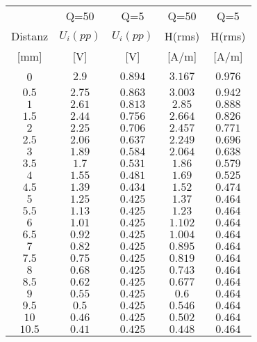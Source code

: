 \documentclass[12pt,a4paper,ngerman]{article}
\begin{document}
\centering
\begin{tabular}{ |c|c|c|c|c| }
  \hline
     & Q=50 & Q=5 & Q=50 & Q=5\\

    Distanz & $U_i(pp)$ & $U_i(pp)$ & H(rms) & H(rms)\\

  [mm] & [V] & [V] & [A/m] & [A/m] \\
  \hline
  0 & $2.9$ & $0.894$ & $3.167$ & $0.976$ \\
  \hline
  $0.5$ & $2.75$ & $0.863$ & $3.003$ & $0.942$ \\
  \hline
  $1$ & $2.61$ & $0.813$ & $2.85$ & $0.888$ \\
  \hline
  $1.5$ & $2.44$ & $0.756$ & $2.664$ & $0.826$ \\
    \hline
  $2$ & $2.25$ & $0.706$ & $2.457$ & $0.771$ \\
    \hline
  $2.5$ & $2.06$ & $0.637$ & $2.249$ & $0.696$ \\
    \hline
  $3$ & $1.89$ & $0.584$ & $2.064$ & $0.638$ \\
    \hline
  $3.5$ & $1.7$ & $0.531$ & $1.86$ & $0.579$\\
    \hline
  $4$ & $1.55$ & $0.481$ & $1.69$ & $0.525$ \\
    \hline
  $4.5$ & $1.39$ & $0.434$ & $1.52$ & $0.474$ \\
    \hline
  $5$ & $1.25$ & $0.425$ & $1.37$ & $0.464$ \\
    \hline
  $5.5$ & $1.13$ & $0.425$ & $1.23$ & $0.464$ \\
     \hline
  $6$ & $1.01$ & $0.425$ & $1.102$ & $0.464$ \\
      \hline
  $6.5$ & $0.92$ & $0.425$ & $1.004$ & $0.464$ \\ 
      \hline
  $7$ & $0.82$ & $0.425$ & $0.895$ & $0.464$ \\
      \hline
  $7.5$ & $0.75$ & $0.425$ & $0.819$ & $0.464$ \\
      \hline
  $8$ & $0.68$ & $0.425$ & $0.743$ & $0.464$ \\
      \hline
  $8.5$ & $0.62$ & $0.425$ & $0.677$ & $0.464$ \\
      \hline
  $9$ & $0.55$ & $0.425$ & $0.6$ & $0.464$ \\
      \hline
  $9.5$ & $0.5$ & $0.425$ & $0.546$ & $0.464$ \\
      \hline
  $10$ & $0.46$ & $0.425$ & $0.502$ & $0.464$ \\
      \hline
  $10.5$ & $0.41$ & $0.425$ & $0.448$ & $0.464$ \\

\end{tabular}
\end{document}

